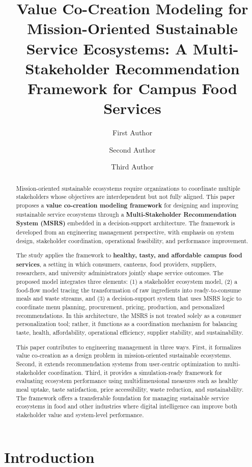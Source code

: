 \documentclass[
  letterpaper,
  DIV=11,
  numbers=noendperiod]{scrartcl}
\title{Value Co-Creation Modeling for Mission-Oriented Sustainable
Service Ecosystems: A Multi-Stakeholder Recommendation Framework for
Campus Food Services}
\author{First Author \and Second Author \and Third Author}
\date{}
\begin{document}
\maketitle
\begin{abstract}
Mission-oriented sustainable ecosystems require organizations to
coordinate multiple stakeholders whose objectives are interdependent but
not fully aligned. This paper proposes a \textbf{value co-creation
modeling framework} for designing and improving sustainable service
ecosystems through a \textbf{Multi-Stakeholder Recommendation System
(MSRS)} embedded in a decision-support architecture. The framework is
developed from an engineering management perspective, with emphasis on
system design, stakeholder coordination, operational feasibility, and
performance improvement.

The study applies the framework to \textbf{healthy, tasty, and
affordable campus food services}, a setting in which consumers,
canteens, food providers, suppliers, researchers, and university
administrators jointly shape service outcomes. The proposed model
integrates three elements: (1) a stakeholder ecosystem model, (2) a
food-flow model tracing the transformation of raw ingredients into
ready-to-consume meals and waste streams, and (3) a decision-support
system that uses MSRS logic to coordinate menu planning, procurement,
pricing, production, and personalized recommendations. In this
architecture, the MSRS is not treated solely as a consumer
personalization tool; rather, it functions as a coordination mechanism
for balancing taste, health, affordability, operational efficiency,
supplier stability, and sustainability.

This paper contributes to engineering management in three ways. First,
it formalizes value co-creation as a design problem in mission-oriented
sustainable ecosystems. Second, it extends recommendation systems from
user-centric optimization to multi-stakeholder coordination. Third, it
provides a simulation-ready framework for evaluating ecosystem
performance using multidimensional measures such as healthy meal uptake,
taste satisfaction, price accessibility, waste reduction, and
sustainability. The framework offers a transferable foundation for
managing sustainable service ecosystems in food and other industries
where digital intelligence can improve both stakeholder value and
system-level performance.
\end{abstract}


\section{Introduction}\label{introduction}
\end{document}
